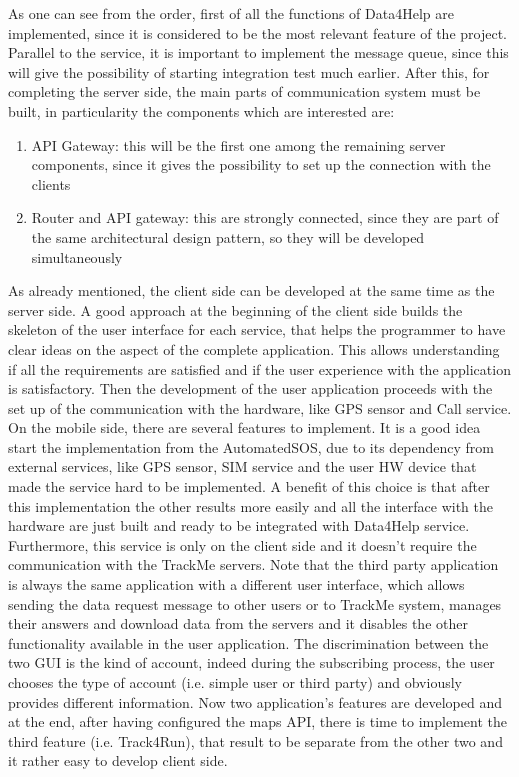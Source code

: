 As one can see from the order, first of all the functions of Data4Help are implemented, since it is
considered to be the most relevant feature of the project. \\ 
Parallel to the service, it is important to implement the message queue, since this will give the 
possibility of starting integration test much earlier. 
 After this, for completing the server side, the main parts of communication system must be built, in
particularity the components which are interested are: 
\begin{enumerate}
\item API Gateway: this will be the first one among the remaining server components, since it gives the
possibility to set up the connection with the clients
\item Router and API gateway: this are strongly connected, since they are part of the same architectural
design pattern, so they will be developed simultaneously
\end{enumerate}
\par
As already mentioned, the client side can be developed at the same time as the server side. 
A good approach at the beginning of the client side builds the skeleton of the user interface for each service, that helps the programmer to have clear ideas on the aspect of the complete application. This allows understanding if all the requirements are satisfied and if the user experience with the application is satisfactory. 
Then the development of the user application proceeds with the set up of the communication with the hardware,
like GPS sensor and Call service. \\
On the mobile side, there are several features to implement. It is a good idea start the implementation from the AutomatedSOS, due to its dependency from external services, like GPS sensor, SIM service and the user HW device that made the service hard to be implemented. A benefit of this choice is that after this implementation the other results more easily and all the interface with the hardware are just built and ready to be integrated with Data4Help service. Furthermore, this service is only on the client side and it doesn't require the communication with the TrackMe servers. Note that the third party application is always the same application with a different user interface, which allows sending the data request message to other users or to TrackMe system, manages their answers and download data from the servers and it disables the other functionality available in the user application. The discrimination between the two GUI is the kind of account, indeed during the subscribing process, the user chooses the type of account (i.e. simple user or third party) and obviously provides different information. Now two application's features are developed and at the end, after having configured the maps API, there is time to implement the third feature (i.e. Track4Run), that result to be separate from the other two and it rather easy to develop client side.